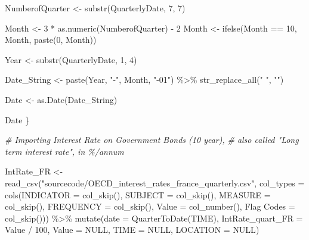 \documentclass[
]{article}
\newenvironment{Shaded}{\begin{snugshade}}{\end{snugshade}}
\newcommand{\AttributeTok}[1]{\textcolor[rgb]{0.77,0.63,0.00}{#1}}
\newcommand{\CommentTok}[1]{\textcolor[rgb]{0.56,0.35,0.01}{\textit{#1}}}
\newcommand{\ConstantTok}[1]{\textcolor[rgb]{0.00,0.00,0.00}{#1}}
\newcommand{\DecValTok}[1]{\textcolor[rgb]{0.00,0.00,0.81}{#1}}
\newcommand{\FunctionTok}[1]{\textcolor[rgb]{0.00,0.00,0.00}{#1}}
\newcommand{\NormalTok}[1]{#1}
\newcommand{\OtherTok}[1]{\textcolor[rgb]{0.56,0.35,0.01}{#1}}
\newcommand{\SpecialCharTok}[1]{\textcolor[rgb]{0.00,0.00,0.00}{#1}}
\newcommand{\StringTok}[1]{\textcolor[rgb]{0.31,0.60,0.02}{#1}}
\begin{document}
\begin{Shaded}
\begin{Highlighting}[]
\NormalTok{  NumberofQuarter }\OtherTok{\textless{}{-}} \FunctionTok{substr}\NormalTok{(QuarterlyDate, }\DecValTok{7}\NormalTok{, }\DecValTok{7}\NormalTok{)}
  
\NormalTok{  Month }\OtherTok{\textless{}{-}} \DecValTok{3} \SpecialCharTok{*} \FunctionTok{as.numeric}\NormalTok{(NumberofQuarter) }\SpecialCharTok{{-}} \DecValTok{2}
\NormalTok{  Month }\OtherTok{\textless{}{-}} \FunctionTok{ifelse}\NormalTok{(Month }\SpecialCharTok{==} \DecValTok{10}\NormalTok{, Month, }\FunctionTok{paste}\NormalTok{(}\DecValTok{0}\NormalTok{, Month))}
  
\NormalTok{  Year }\OtherTok{\textless{}{-}} \FunctionTok{substr}\NormalTok{(QuarterlyDate, }\DecValTok{1}\NormalTok{, }\DecValTok{4}\NormalTok{)}
  
\NormalTok{  Date\_String }\OtherTok{\textless{}{-}} \FunctionTok{paste}\NormalTok{(Year, }\StringTok{"{-}"}\NormalTok{, Month, }\StringTok{"{-}01"}\NormalTok{) }\SpecialCharTok{\%\textgreater{}\%}
    \FunctionTok{str\_replace\_all}\NormalTok{(}\StringTok{" "}\NormalTok{, }\StringTok{""}\NormalTok{)}
  
\NormalTok{  Date }\OtherTok{\textless{}{-}} \FunctionTok{as.Date}\NormalTok{(Date\_String)}
  
\NormalTok{  Date}
\NormalTok{\}}

\CommentTok{\# Importing Interest Rate on Government Bonds (10 year), }
\CommentTok{\# also called "Long term interest rate", in \%/annum}

\NormalTok{IntRate\_FR }\OtherTok{\textless{}{-}} \FunctionTok{read\_csv}\NormalTok{(}\StringTok{"sourcecode/OECD\_interest\_rates\_france\_quarterly.csv"}\NormalTok{, }
    \AttributeTok{col\_types =} \FunctionTok{cols}\NormalTok{(}\AttributeTok{INDICATOR =} \FunctionTok{col\_skip}\NormalTok{(), }
        \AttributeTok{SUBJECT =} \FunctionTok{col\_skip}\NormalTok{(), }\AttributeTok{MEASURE =} \FunctionTok{col\_skip}\NormalTok{(), }
        \AttributeTok{FREQUENCY =} \FunctionTok{col\_skip}\NormalTok{(), }\AttributeTok{Value =} \FunctionTok{col\_number}\NormalTok{(), }
        \StringTok{\textasciigrave{}}\AttributeTok{Flag Codes}\StringTok{\textasciigrave{}} \OtherTok{=} \FunctionTok{col\_skip}\NormalTok{())) }\SpecialCharTok{\%\textgreater{}\%}
  \FunctionTok{mutate}\NormalTok{(}\AttributeTok{date =} \FunctionTok{QuarterToDate}\NormalTok{(TIME),}
         \AttributeTok{IntRate\_quart\_FR =}\NormalTok{ Value }\SpecialCharTok{/} \DecValTok{100}\NormalTok{,}
         \AttributeTok{Value =} \ConstantTok{NULL}\NormalTok{, }\AttributeTok{TIME =} \ConstantTok{NULL}\NormalTok{, }\AttributeTok{LOCATION =} \ConstantTok{NULL}\NormalTok{)}



\end{Highlighting}
\end{Shaded}
\end{document}
